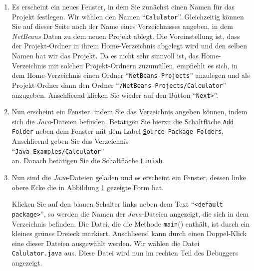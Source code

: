 \documentclass{article}
\begin{document}
\begin{enumerate}
      Au\3erdem k\"onnen Sie unter der Überschrift \texttt{\underline{P}rojects}
      die Art des Projektes festlegen.  Hier w\"ahlen Sie \\[0.1cm]
      \hspace*{1.3cm} \texttt{Java Project with Existing Sources} \\[0.1cm]
      und klicken anschlie\3end auf den Button ``\texttt{Next>}''.
\item Es erscheint ein neues Fenster, in dem Sie zun\"achst einen Namen f\"ur das Projekt festlegen.
      Wir w\"ahlen den Namen ``\texttt{Calulator}''.
      Gleichzeitig k\"onnen Sie auf dieser Seite noch der Name eines Verzeichnisses angeben,
      in dem \textsl{NetBeans} Daten zu dem neuen Projekt ablegt. 
      Die Voreinstellung ist, dass der Projekt-Ordner in ihrem Home-Verzeichnis  
      abgelegt wird und den selben Namen hat wir das Projekt.  Da es nicht sehr sinnvoll
      ist, das Home-Verzeichnis mit solchen Projekt-Ordnern zuzum\"ullen, empfiehlt es sich,
      in dem Home-Verzeichnis einen Ordner ``\texttt{NetBeans-Projects}'' anzulegen und als
      Projekt-Ordner dann den Ordner ``\texttt{/NetBeans-Projects/Calculator}''
      anzugeben.   Anschlie\3end klicken Sie wieder auf den Button ``\texttt{Next>}''.
\item Nun erscheint ein Fenster, indem Sie das Verzeichnis angeben k\"onnen, indem sich die
      \textsl{Java}-Dateien befinden.  Bet\"atigen Sie hierzu die Schaltfl\"ache
      \texttt{\underline{A}dd Folder} neben dem Fenster mit dem Label
      \texttt{\underline{S}ource Package Folders}.
      Anschlie\3end geben Sie das Verzeichnis \\[0.1cm]
      \hspace*{1.3cm} 
      ``\texttt{Java-Examples/Calculator}'' \\[0.1cm]
      an. Danach bet\"atigen Sie die
      Schaltfl\"ache \texttt{\underline{F}inish}.
\item Nun sind die \textsl{Java}-Dateien geladen und es erscheint ein Fenster,
      dessen linke obere Ecke die in Abbildung \ref{fig:left} gezeigte Form hat.
\begin{figure}[!h]
  \centering
  \label{fig:left}
\end{figure}
      Klicken Sie auf den blauen Schalter links neben dem Text ``\texttt{<default package>}'',
      so werden die Namen der \textsl{Java}-Dateien angezeigt, die sich in dem Verzeichnis
      befinden.  Die Datei, die die Methode \texttt{main}() enth\"alt, ist durch ein kleines
      gr\"unes Dreieck markiert.
      Anschlie\3end kann durch einen Doppel-Klick eine dieser Dateien ausgew\"ahlt werden.
      Wir w\"ahlen die Datei \texttt{Calulator.java} aus.  Diese Datei wird nun im rechten
      Teil des Debuggers angezeigt. 
\end{enumerate}
\end{document}
